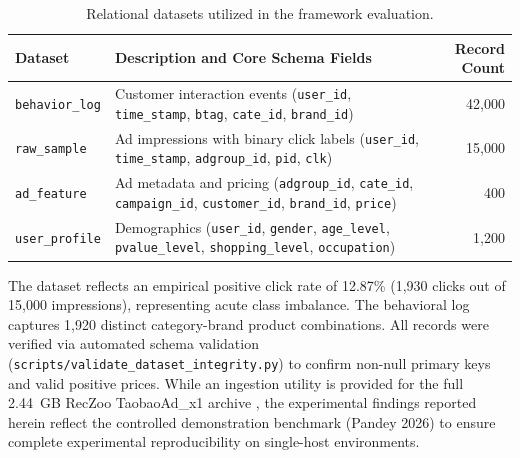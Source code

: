 \documentclass[10pt,a4paper,twoside]{article}
\begin{document}
\begin{table}[ht]
\centering
\small
\caption{Relational datasets utilized in the framework evaluation.}
\label{tab:datasets}
\begin{tabular}{llr}
\toprule
\textbf{Dataset} & \textbf{Description and Core Schema Fields} & \textbf{Record Count} \\
\midrule
\texttt{behavior\_log} & Customer interaction events (\texttt{user\_id}, \texttt{time\_stamp}, \texttt{btag}, \texttt{cate\_id}, \texttt{brand\_id}) & 42,000 \\
\texttt{raw\_sample} & Ad impressions with binary click labels (\texttt{user\_id}, \texttt{time\_stamp}, \texttt{adgroup\_id}, \texttt{pid}, \texttt{clk}) & 15,000 \\
\texttt{ad\_feature} & Ad metadata and pricing (\texttt{adgroup\_id}, \texttt{cate\_id}, \texttt{campaign\_id}, \texttt{customer\_id}, \texttt{brand\_id}, \texttt{price}) & 400 \\
\texttt{user\_profile} & Demographics (\texttt{user\_id}, \texttt{gender}, \texttt{age\_level}, \texttt{pvalue\_level}, \texttt{shopping\_level}, \texttt{occupation}) & 1,200 \\
\bottomrule
\end{tabular}
\end{table}

The dataset reflects an empirical positive click rate of 12.87\% (1,930 clicks out of 15,000 impressions), representing acute class imbalance. The behavioral log captures 1,920 distinct category-brand product combinations. All records were verified via automated schema validation (\texttt{scripts/validate\_dataset\_integrity.py}) to confirm non-null primary keys and valid positive prices. While an ingestion utility is provided for the full 2.44~GB RecZoo TaobaoAd\_x1 archive \cite{reczoo2024}, the experimental findings reported herein reflect the controlled demonstration benchmark (Pandey 2026) to ensure complete experimental reproducibility on single-host environments.
\end{document}
